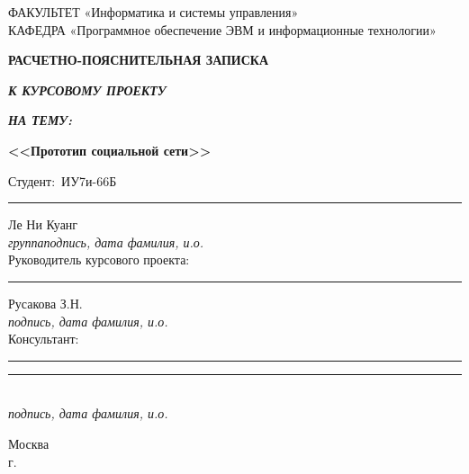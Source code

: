 \begin{titlepage}
	{\doublespacing \small \raggedright ФАКУЛЬТЕТ \hspace{25mm} «Информатика и системы управления»\\
	КАФЕДРА \hspace{5mm} «Программное обеспечение ЭВМ и информационные технологии»\\}

	\vspace{35mm}

	\textbf{\Large{РАСЧЕТНО-ПОЯСНИТЕЛЬНАЯ ЗАПИСКА}}
	\vspace{8mm}

	\textbf{\large{\textit{К КУРСОВОМУ ПРОЕКТУ}}}
	\vspace{7mm}

	\textbf{\large{\textit{НА ТЕМУ:}}}
	\vspace{7mm}

	\textbf{\Large{<<Прототип социальной сети>>}}
	\vspace{35mm}


	Студент: \hrulefill \,ИУ7и-66Б \hrulefill		\hspace{25mm}	\hfill \rule{3cm}{0.4pt} \hfill \hrulefill Ле Ни Куанг\hrulefill\\
	{\footnotesize \textit{\hspace{18mm}группа\hspace{50mm}подпись, дата \hspace{17mm} фамилия, и.о.}\\}
	\vspace{4mm}
	Руководитель курсового проекта:			\hspace{12mm}	\hfill \rule{2.9cm}{0.4pt} \hfill \hrulefill Русакова З.Н.\hrulefill\\
	{\footnotesize \textit{\hspace{78mm}подпись, дата \hspace{17mm} фамилия, и.о.}\\}
	\vspace{4mm}
	Консультант:							\hspace{49mm}	\hfill \rule{3cm}{0.4pt} \hfill \rule{3.7cm}{0.4pt}\\
	{\footnotesize \textit{\hspace{78mm}подпись, дата \hspace{17mm} фамилия, и.о.}\\}

	\vfill

	Москва\\
	\the\year г.
\end{titlepage}
